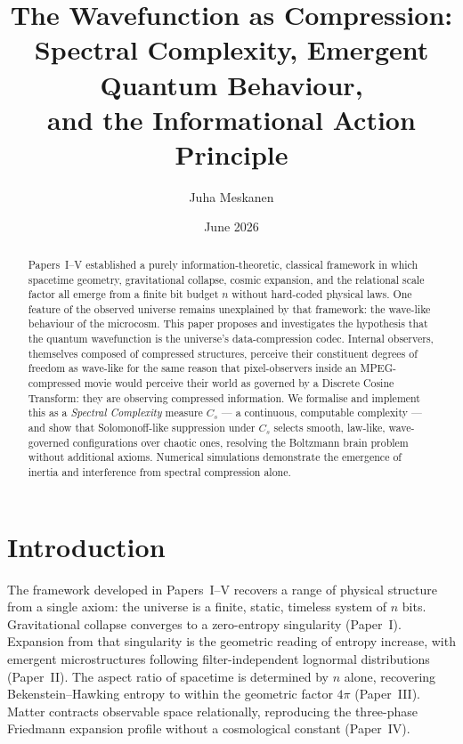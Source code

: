 \documentclass[11pt]{article}
\title{The Wavefunction as Compression:\\
Spectral Complexity, Emergent Quantum Behaviour,\\
and the Informational Action Principle}
\author{Juha Meskanen}
\date{June 2026}
\begin{document}
\maketitle

\begin{abstract}
  Papers~I--V \cite{meskanen2001, meskanen2002, meskanen2003, meskanen2026iv}
  established a purely information-theoretic, classical framework in which
spacetime geometry, gravitational collapse, cosmic expansion, and the
relational scale factor all emerge from a finite bit budget $n$ without
hard-coded physical laws. One feature of the observed universe remains
unexplained by that framework: the wave-like behaviour of the microcosm.
This paper proposes and investigates the hypothesis that the quantum
wavefunction is the universe's data-compression codec. Internal observers,
themselves composed of compressed structures, perceive their constituent
degrees of freedom as wave-like for the same reason that pixel-observers
inside an MPEG-compressed movie would perceive their world as governed by
a Discrete Cosine Transform: they are observing compressed information.
We formalise and implement this as a \emph{Spectral Complexity} measure $C_s$ --- a
continuous, computable complexity --- and show
that Solomonoff-like suppression under $C_s$ selects smooth, law-like,
wave-governed configurations over chaotic ones, resolving the Boltzmann
brain problem without additional axioms. Numerical simulations demonstrate
the emergence of inertia and interference from spectral compression alone.
\end{abstract}

\tableofcontents
\newpage

\section{Introduction}
\label{sec:intro}

The framework developed in Papers~I--V recovers a range of
physical structure from a single axiom: the universe is a finite, static,
timeless system of $n$ bits. Gravitational collapse converges to a
zero-entropy singularity (Paper~I). Expansion from that singularity is
the geometric reading of entropy increase, with emergent microstructures
following filter-independent lognormal distributions (Paper~II). The
aspect ratio of spacetime is determined by $n$ alone, recovering
Bekenstein--Hawking entropy to within the geometric factor $4\pi$
(Paper~III). Matter contracts observable space relationally, reproducing
the three-phase Friedmann expansion profile without a cosmological
constant (Paper~IV).
\end{document}
